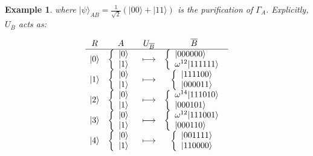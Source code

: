 \documentclass[]{amsart}
\DeclarePairedDelimiter\ket{\lvert}{\rangle}
\newtheorem{example}[theorem]{Example}
\begin{document}
\begin{example}
where $|\psi\rangle_{AB} = \frac{1}{\sqrt2}(|00\rangle + |11\rangle)$ is the purification of $\Gamma_A$. Explicitly, $U_{\overline{B}}$ acts as:

\[
\begin{array}{cccc} 
R & A & U_{\overline{B}}  & \overline{B}  \\ \hline 
\ket{0} & \left\{ \begin{array}{l}  \ket{0} \\ \ket{1} \end{array} \right. & \longmapsto & \left\{ \begin{array}{l} \ket{000000} \\ \omega^{12}\ket{111111} \end{array} \right. \\ 
\ket{1} & \left\{ \begin{array}{l}  \ket{0} \\ \ket{1} \end{array} \right. & \longmapsto & \left\{ \begin{array}{l} \ket{111100} \\ \ket{000011} \end{array} \right. \\
\ket{2} & \left\{ \begin{array}{l}  \ket{0} \\ \ket{1} \end{array} \right. & \longmapsto & \left\{ \begin{array}{l} \omega^{14}\ket{111010} \\ \ket{000101} \end{array} \right. \\  
\ket{3} & \left\{ \begin{array}{l}  \ket{0} \\ \ket{1} \end{array} \right. & \longmapsto & \left\{ \begin{array}{l} \omega^{12}\ket{111001} \\ \ket{000110} \end{array} \right. \\  
\ket{4} & \left\{ \begin{array}{l}  \ket{0} \\ \ket{1} \end{array} \right. & \longmapsto & \left\{ \begin{array}{l} \ket{001111} \\ \ket{110000} \end{array} \right. \\  

\end{array}\]
\end{example}
\end{document}
